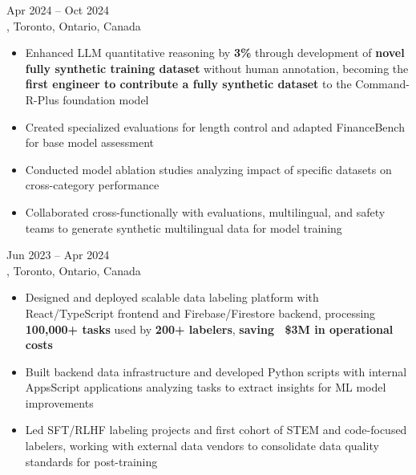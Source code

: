 \documentclass[letterpaper,10pt]{article}
\begin{document}
\hspace{0.15in}{\large\bfseries Machine Learning Engineer Intern} \hfill {\small Apr 2024 -- Oct 2024} \\
\hspace{0.15in}{\bfseries Cohere}, Toronto, Ontario, Canada
\vspace{-1pt}
\begin{itemize}[leftmargin=0.35in, itemsep=-1pt, topsep=1pt, labelsep=0.035in]
\item Enhanced LLM quantitative reasoning by \textbf{3\%} through development of \textbf{novel fully synthetic training dataset} without human annotation, becoming the \textbf{first engineer to contribute a fully synthetic dataset} to the Command-R-Plus foundation model
\item Created specialized evaluations for length control and adapted FinanceBench for base model assessment
\item Conducted model ablation studies analyzing impact of specific datasets on cross-category performance
\item Collaborated cross-functionally with evaluations, multilingual, and safety teams to generate synthetic multilingual data for model training
\end{itemize}
\vspace{1pt}

\hspace{0.15in}{\large\bfseries Senior Data Quality Team Lead} \hfill {\small Jun 2023 -- Apr 2024} \\
\hspace{0.15in}{\bfseries Cohere}, Toronto, Ontario, Canada
\vspace{-1pt}
\begin{itemize}[leftmargin=0.35in, itemsep=-1pt, topsep=1pt, labelsep=0.035in]
\item Designed and deployed scalable data labeling platform with React/TypeScript frontend and Firebase/Firestore backend, processing \textbf{100,000+ tasks} used by \textbf{200+ labelers}, \textbf{saving ~\$3M in operational costs}
\item Built backend data infrastructure and developed Python scripts with internal AppsScript applications analyzing tasks to extract insights for ML model improvements
\item Led SFT/RLHF labeling projects and first cohort of STEM and code-focused labelers, working with external data vendors to consolidate data quality standards for post-training
\end{itemize}
\vspace{1pt}
\end{document}
